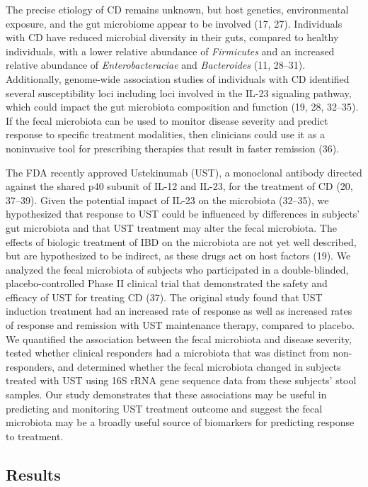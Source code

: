 \documentclass[12pt,]{article}
\begin{document}
The precise etiology of CD remains unknown, but host genetics,
environmental exposure, and the gut microbiome appear to be involved
(17, 27). Individuals with CD have reduced microbial diversity in their
guts, compared to healthy individuals, with a lower relative abundance
of \emph{Firmicutes} and an increased relative abundance of
\emph{Enterobacteraciae} and \emph{Bacteroides} (11, 28--31).
Additionally, genome-wide association studies of individuals with CD
identified several susceptibility loci including loci involved in the
IL-23 signaling pathway, which could impact the gut microbiota
composition and function (19, 28, 32--35). If the fecal microbiota can
be used to monitor disease severity and predict response to specific
treatment modalities, then clinicians could use it as a noninvasive tool
for prescribing therapies that result in faster remission (36).

The FDA recently approved Ustekinumab (UST), a monoclonal antibody
directed against the shared p40 subunit of IL-12 and IL-23, for the
treatment of CD (20, 37--39). Given the potential impact of IL-23 on the
microbiota (32--35), we hypothesized that response to UST could be
influenced by differences in subjects' gut microbiota and that UST
treatment may alter the fecal microbiota. The effects of biologic
treatment of IBD on the microbiota are not yet well described, but are
hypothesized to be indirect, as these drugs act on host factors (19). We
analyzed the fecal microbiota of subjects who participated in a
double-blinded, placebo-controlled Phase II clinical trial that
demonstrated the safety and efficacy of UST for treating CD (37). The
original study found that UST induction treatment had an increased rate
of response as well as increased rates of response and remission with
UST maintenance therapy, compared to placebo. We quantified the
association between the fecal microbiota and disease severity, tested
whether clinical responders had a microbiota that was distinct from
non-responders, and determined whether the fecal microbiota changed in
subjects treated with UST using 16S rRNA gene sequence data from these
subjects' stool samples. Our study demonstrates that these associations
may be useful in predicting and monitoring UST treatment outcome and
suggest the fecal microbiota may be a broadly useful source of
biomarkers for predicting response to treatment.

\subsection{Results}\label{results}
\end{document}

